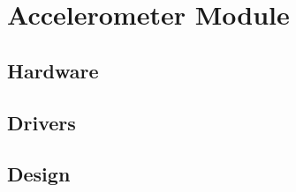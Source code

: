

\section{Accelerometer  Module}
\label{sec:imu}

\subsection{Hardware}


\subsection{ Drivers}


\subsection {Design}






